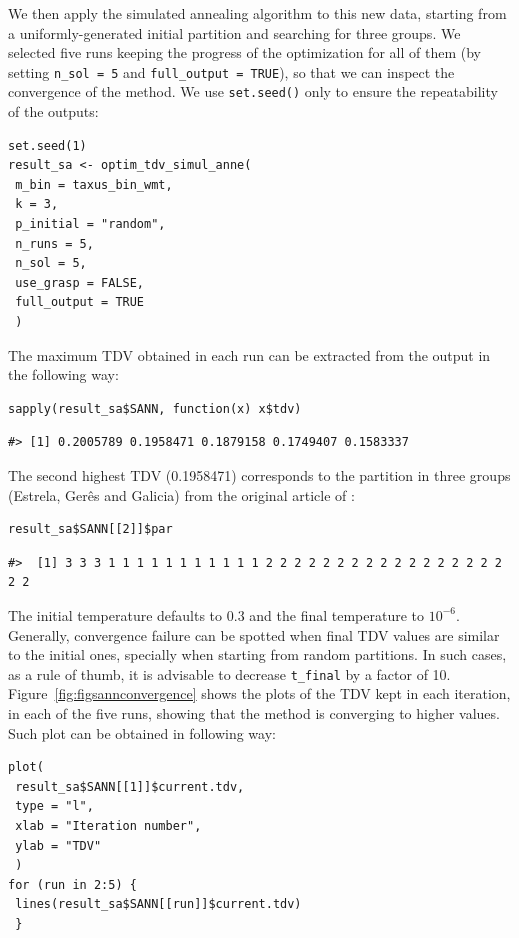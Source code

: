 We then apply the simulated annealing algorithm to this new data, starting from a uniformly-generated initial partition and searching for three groups. We selected five runs keeping the progress of the optimization for all of them (by setting \texttt{n\_sol\ =\ 5} and \texttt{full\_output\ =\ TRUE}), so that we can inspect the convergence of the method. We use \texttt{set.seed()} only to ensure the repeatability of the outputs:

\begin{verbatim}
set.seed(1)
result_sa <- optim_tdv_simul_anne(
 m_bin = taxus_bin_wmt,
 k = 3,
 p_initial = "random",
 n_runs = 5,
 n_sol = 5,
 use_grasp = FALSE,
 full_output = TRUE
 )
\end{verbatim}

The maximum TDV obtained in each run can be extracted from the output in the following way:

\begin{verbatim}
sapply(result_sa$SANN, function(x) x$tdv)
\end{verbatim}

\begin{verbatim}
#> [1] 0.2005789 0.1958471 0.1879158 0.1749407 0.1583337
\end{verbatim}

The second highest TDV (0.1958471) corresponds to the partition in three groups (Estrela, Gerês and Galicia) from the original article of \citet{PEMCFGFN21}:

\begin{verbatim}
result_sa$SANN[[2]]$par
\end{verbatim}

\begin{verbatim}
#>  [1] 3 3 3 1 1 1 1 1 1 1 1 1 1 1 2 2 2 2 2 2 2 2 2 2 2 2 2 2 2 2 2 2 2
\end{verbatim}

The initial temperature defaults to \(0.3\) and the final temperature to \(10^{-6}\). Generally, convergence failure can be spotted when final TDV values are similar to the initial ones, specially when starting from random partitions. In such cases, as a rule of thumb, it is advisable to decrease \texttt{t\_final} by a factor of 10. Figure~\ref{fig:figsannconvergence} shows the plots of the TDV kept in each iteration, in each of the five runs, showing that the method is converging to higher values. Such plot can be obtained in following way:

\begin{verbatim}
plot(
 result_sa$SANN[[1]]$current.tdv,
 type = "l",
 xlab = "Iteration number",
 ylab = "TDV"
 )
for (run in 2:5) {
 lines(result_sa$SANN[[run]]$current.tdv)
 }
\end{verbatim}

